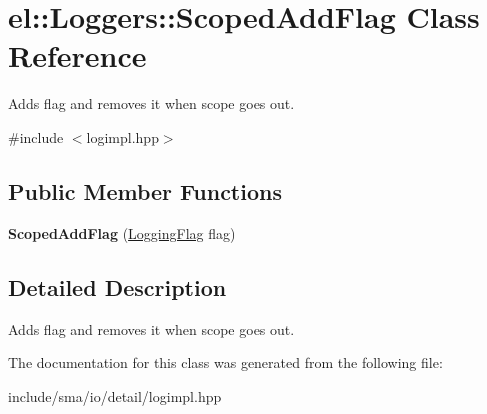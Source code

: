 \hypertarget{classel_1_1Loggers_1_1ScopedAddFlag}{\section{el\-:\-:Loggers\-:\-:Scoped\-Add\-Flag Class Reference}
\label{classel_1_1Loggers_1_1ScopedAddFlag}
}


Adds flag and removes it when scope goes out.  




{\ttfamily \#include $<$logimpl.\-hpp$>$}

\subsection*{Public Member Functions}
\begin{DoxyCompactItemize}
\item 
\hypertarget{classel_1_1Loggers_1_1ScopedAddFlag_a13e0b1052cd1a7a15fae63fd6454d598}{{\bfseries Scoped\-Add\-Flag} (\hyperlink{namespaceel_a2784aacd04cb7816ac1c0b20fcbf83cb}{Logging\-Flag} flag)}\label{classel_1_1Loggers_1_1ScopedAddFlag_a13e0b1052cd1a7a15fae63fd6454d598}

\end{DoxyCompactItemize}


\subsection{Detailed Description}
Adds flag and removes it when scope goes out. 

The documentation for this class was generated from the following file\-:\begin{DoxyCompactItemize}
\item 
include/sma/io/detail/logimpl.\-hpp\end{DoxyCompactItemize}
